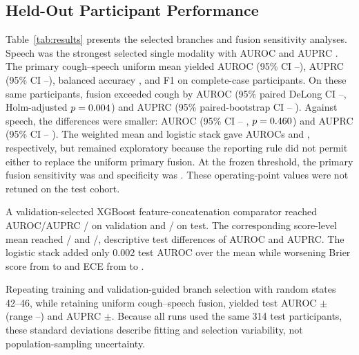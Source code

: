 \documentclass[conference]{IEEEtran}
\begin{document}
\subsection{Held-Out Participant Performance}

Table~\ref{tab:results} presents the selected branches and fusion sensitivity
analyses. Speech was the strongest selected single modality with AUROC
\SpeechTestAUROC{} and AUPRC \SpeechTestAUPRC{}. The primary cough--speech
uniform mean yielded AUROC \FusionTestAUROC{} (95\% CI
\FusionAUCILow{}--\FusionAUCIHigh{}), AUPRC \FusionTestAUPRC{} (95\% CI
\FusionAUPRCILow{}--\FusionAUPRCIHigh{}), balanced accuracy
\FusionTestBalancedAccuracy{}, and F1 \FusionTestFOne{} on
\FusionTestN{} complete-case participants. On these same participants, fusion
exceeded cough by \FusionMinusCoughAUROC{} AUROC (95\% paired DeLong CI
\FusionMinusCoughAUCILow{}--\FusionMinusCoughAUCIHigh{}, Holm-adjusted
$p=0.004$) and \FusionMinusCoughAUPRC{} AUPRC
(95\% paired-bootstrap CI \FusionMinusCoughAUPRCILow{}--
\FusionMinusCoughAUPRCIHigh{}). Against speech, the differences were smaller:
\FusionMinusSpeechAUROC{} AUROC (95\% CI \FusionMinusSpeechAUCILow{}--
\FusionMinusSpeechAUCIHigh{}, $p=0.460$) and
\FusionMinusSpeechAUPRC{} AUPRC (95\% CI \FusionMinusSpeechAUPRCILow{}--
\FusionMinusSpeechAUPRCIHigh{}). The weighted mean and logistic stack gave
AUROCs \WeightedTestAUROC{} and \StackTestAUROC{}, respectively, but remained
exploratory because the reporting rule did not permit either to replace the
uniform primary fusion.
At the frozen threshold, the primary fusion sensitivity was
\FusionTestSensitivity{} and specificity was \FusionTestSpecificity{}. These
operating-point values were not retuned on the test cohort.

A validation-selected XGBoost feature-concatenation comparator reached
AUROC/AUPRC \FeatureFusionValidationAUROC{}/\FeatureFusionValidationAUPRC{}
on validation and \FeatureFusionTestAUROC{}/\FeatureFusionTestAUPRC{} on test.
The corresponding score-level mean reached \FusionValidationAUROC{}/
\FusionValidationAUPRC{} and \FusionTestAUROC{}/\FusionTestAUPRC{}, descriptive
test differences of \ScoreMinusFeatureAUROC{} AUROC and
\ScoreMinusFeatureAUPRC{} AUPRC. The logistic stack added only 0.002 test
AUROC over the mean while worsening Brier score from \UniformTestBrier{} to
\StackTestBrier{} and ECE from \UniformTestECE{} to \StackTestECE{}.

Repeating training and validation-guided branch selection with random states
42--46, while retaining uniform cough--speech fusion, yielded test AUROC
\MultiSeedAUROCMean{}$\pm$\MultiSeedAUROCSD{} (range
\MultiSeedAUROCLow{}--\MultiSeedAUROCHigh{}) and AUPRC
\MultiSeedAUPRCMean{}$\pm$\MultiSeedAUPRCSD{}. Because all runs used the same
314 test participants, these standard deviations describe fitting and
selection variability, not population-sampling uncertainty.
\end{document}
